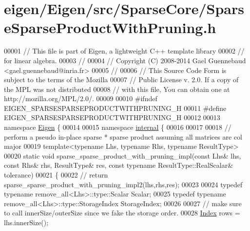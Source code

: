 \hypertarget{eigen_2_eigen_2src_2_sparse_core_2_sparse_sparse_product_with_pruning_8h_source}{}\section{eigen/\+Eigen/src/\+Sparse\+Core/\+Sparse\+Sparse\+Product\+With\+Pruning.h}
\label{eigen_2_eigen_2src_2_sparse_core_2_sparse_sparse_product_with_pruning_8h_source}

\begin{DoxyCode}
00001 \textcolor{comment}{// This file is part of Eigen, a lightweight C++ template library}
00002 \textcolor{comment}{// for linear algebra.}
00003 \textcolor{comment}{//}
00004 \textcolor{comment}{// Copyright (C) 2008-2014 Gael Guennebaud <gael.guennebaud@inria.fr>}
00005 \textcolor{comment}{//}
00006 \textcolor{comment}{// This Source Code Form is subject to the terms of the Mozilla}
00007 \textcolor{comment}{// Public License v. 2.0. If a copy of the MPL was not distributed}
00008 \textcolor{comment}{// with this file, You can obtain one at http://mozilla.org/MPL/2.0/.}
00009 
00010 \textcolor{preprocessor}{#ifndef EIGEN\_SPARSESPARSEPRODUCTWITHPRUNING\_H}
00011 \textcolor{preprocessor}{#define EIGEN\_SPARSESPARSEPRODUCTWITHPRUNING\_H}
00012 
00013 \textcolor{keyword}{namespace }\hyperlink{namespace_eigen}{Eigen} \{ 
00014 
00015 \textcolor{keyword}{namespace }\hyperlink{namespaceinternal}{internal} \{
00016 
00017 
00018 \textcolor{comment}{// perform a pseudo in-place sparse * sparse product assuming all matrices are col major}
00019 \textcolor{keyword}{template}<\textcolor{keyword}{typename} Lhs, \textcolor{keyword}{typename} Rhs, \textcolor{keyword}{typename} ResultType>
00020 \textcolor{keyword}{static} \textcolor{keywordtype}{void} sparse\_sparse\_product\_with\_pruning\_impl(\textcolor{keyword}{const} Lhs& lhs, \textcolor{keyword}{const} Rhs& rhs, ResultType& res, \textcolor{keyword}{const} \textcolor{keyword}{
      typename} ResultType::RealScalar& tolerance)
00021 \{
00022   \textcolor{comment}{// return sparse\_sparse\_product\_with\_pruning\_impl2(lhs,rhs,res);}
00023 
00024   \textcolor{keyword}{typedef} \textcolor{keyword}{typename} remove\_all<Lhs>::type::Scalar Scalar;
00025   \textcolor{keyword}{typedef} \textcolor{keyword}{typename} remove\_all<Lhs>::type::StorageIndex StorageIndex;
00026 
00027   \textcolor{comment}{// make sure to call innerSize/outerSize since we fake the storage order.}
00028   \hyperlink{namespace_eigen_a62e77e0933482dafde8fe197d9a2cfde}{Index} rows = lhs.innerSize();

\end{DoxyCode}
